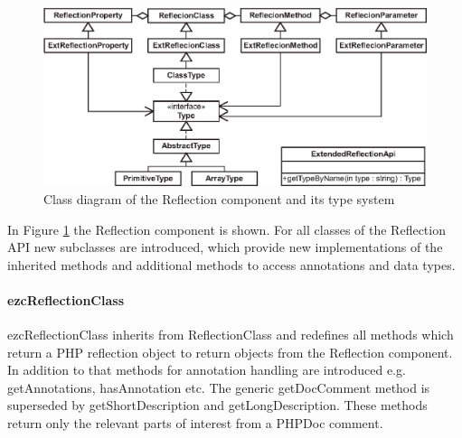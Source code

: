 \documentclass[10pt,final,a4paper,oneside]{article}
\begin{document}
\begin{figure}[htbp]
	\centering
		\includegraphics[width=1.00\textwidth]{figures/ezcReflection.eps}
	\caption{Class diagram of the Reflection component and its type system}
	\label{fig:ezcReflection}
\end{figure}


In Figure \ref{fig:ezcReflection} the Reflection component is shown.
For all classes of the Reflection API
new subclasses are introduced,
which provide new implementations
of the inherited methods and
additional methods to access
annotations and data types.

\paragraph{ezcReflectionClass}
ezcReflectionClass inherits from ReflectionClass
and redefines all methods which return a PHP reflection object
to return objects from the Reflection component.
In addition to that
methods for annotation handling
are introduced e.g. 
getAnnotations,
hasAnnotation etc.
The generic getDocComment method is superseded
by getShortDescription and getLongDescription.
These methods return only the relevant parts
of interest from a PHPDoc comment.

\end{document}
